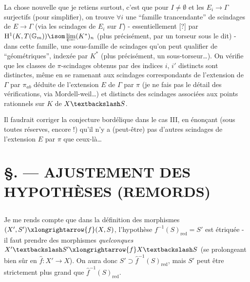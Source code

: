 La chose nouvelle que je retiens surtout, c'est que pour $I \neq \emptyset$ et les $E_i \to \Gamma$ surjectifs (pour simplifier), on trouve $\forall i$ une ``famille trancendante'' de scindages de $E \to \Gamma$ (via les scindages de $E_i$ sur $\Gamma$) - essentiellement [?] par $\mathrm{H}^1(K, T(\mathbb{G}_m)) \isom \varprojlim (K^*)_n$ (plus précisément, par un torseur sous le dit) - dans cette famille, une sous-famille de scindages qu'on peut qualifier de ``géométriques'', indexée par $K^*$ (plus précisément, un sous-torseur\dots). On vérifie que les classes de $\pi$-scindages obtenus par des indices $i$, $i'$ distincts sont distinctes, même en se ramenant aux scindages correspondants de l'extension de $\Gamma$ par $\pi_{ab}$ déduite de l'extension $E$ de $\Gamma$ par $\pi$ (je ne fais pas le détail des vérifications, via Mordell-weil\dots) et distincts des scindages associées aux points rationnels sur $K$ de $X \textbackslash S$.

Il faudrait corriger la conjecture bordélique dans le cas III, en énon\c{c}ant (sous toutes réserves, encore !) qu'il n'y a (peut-être) pas d'autres scindages de l'extension $E$ par $\pi$ que ceux-là\dots














\chapter*{\S {}. --- AJUSTEMENT DES HYPOTHÈSES (REMORDS)}\thispagestyle{empty}
\label{sec:10}
\section*{}

Je me rends compte que dans la définition des morphismes $(X', S') \xlongrightarrow{f} (X, S)$, l'hypothèse $f^{-1}(S)_{\text{red}} = S'$ est étriquée - il faut prendre des morphismes \emph{quelconques} $X' \textbackslash S' \xlongrightarrow{f} X \textbackslash S$ (se prolongeant bien sûr en $\hat{f}: X' \to X$). On aura donc $S' \supset \hat{f}^{-1}(S)_{\text{red}}$, mais $S'$ peut être strictement plus grand que $\hat{f}^{-1}(S)_{\text{red}}$.

